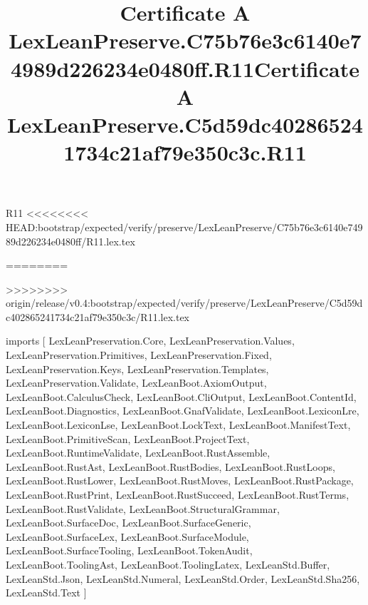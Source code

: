 \begin{lexlean}{R11}
<<<<<<<< HEAD:bootstrap/expected/verify/preserve/LexLeanPreserve/C75b76e3c6140e74989d226234e0480ff/R11.lex.tex
\title{Certificate A LexLeanPreserve.C75b76e3c6140e74989d226234e0480ff.R11}
========
\title{Certificate A LexLeanPreserve.C5d59dc402865241734c21af79e350c3c.R11}
>>>>>>>> origin/release/v0.4:bootstrap/expected/verify/preserve/LexLeanPreserve/C5d59dc402865241734c21af79e350c3c/R11.lex.tex
\begin{coremodule}
imports [
  LexLeanPreservation.Core,
  LexLeanPreservation.Values,
  LexLeanPreservation.Primitives,
  LexLeanPreservation.Fixed,
  LexLeanPreservation.Keys,
  LexLeanPreservation.Templates,
  LexLeanPreservation.Validate,
  LexLeanBoot.AxiomOutput,
  LexLeanBoot.CalculusCheck,
  LexLeanBoot.CliOutput,
  LexLeanBoot.ContentId,
  LexLeanBoot.Diagnostics,
  LexLeanBoot.GnafValidate,
  LexLeanBoot.LexiconLre,
  LexLeanBoot.LexiconLse,
  LexLeanBoot.LockText,
  LexLeanBoot.ManifestText,
  LexLeanBoot.PrimitiveScan,
  LexLeanBoot.ProjectText,
  LexLeanBoot.RuntimeValidate,
  LexLeanBoot.RustAssemble,
  LexLeanBoot.RustAst,
  LexLeanBoot.RustBodies,
  LexLeanBoot.RustLoops,
  LexLeanBoot.RustLower,
  LexLeanBoot.RustMoves,
  LexLeanBoot.RustPackage,
  LexLeanBoot.RustPrint,
  LexLeanBoot.RustSucceed,
  LexLeanBoot.RustTerms,
  LexLeanBoot.RustValidate,
  LexLeanBoot.StructuralGrammar,
  LexLeanBoot.SurfaceDoc,
  LexLeanBoot.SurfaceGeneric,
  LexLeanBoot.SurfaceLex,
  LexLeanBoot.SurfaceModule,
  LexLeanBoot.SurfaceTooling,
  LexLeanBoot.TokenAudit,
  LexLeanBoot.ToolingAst,
  LexLeanBoot.ToolingLatex,
  LexLeanStd.Buffer,
  LexLeanStd.Json,
  LexLeanStd.Numeral,
  LexLeanStd.Order,
  LexLeanStd.Sha256,
  LexLeanStd.Text
]


\end{coremodule}
\end{lexlean}
